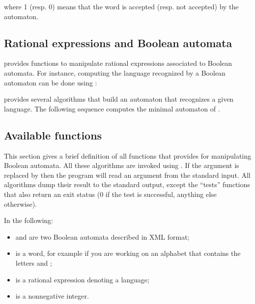 
\noindent
where 1 (resp. 0) means that the word is accepted (resp. not accepted)
by the automaton.

\subsection{Rational expressions and Boolean automata}

\Vauc provides functions to manipulate rational expressions associated
to Boolean automata. For instance, computing the language recognized
by a Boolean automaton can be done using :


\Vauc provides several algorithms that build an automaton that
recognizes a given language.  The following sequence computes the
minimal automaton of .

\begin{center}
\end{center}

\subsection{Available functions}
This section gives a brief definition of all functions that \Vauc
provides for manipulating Boolean automata.  All these algorithms are
invoked using . If
the argument is replaced by \samp{-} then the program will read an
argument from the standard input.  All algorithms dump their result to
the standard output, except the ``tests'' functions that also return
an exit status (0 if the test is successful, anything else otherwise).

\smallskip

In the following:
\begin{itemize}
\item {} and  are two Boolean automata described
  in \Vauc XML format;
\item {} is a word, for example  if you are
  working on an alphabet that contains the letters  and
  ;
\item {} is a rational expression denoting a language;
\item {} is a nonnegative integer.
\end{itemize}


